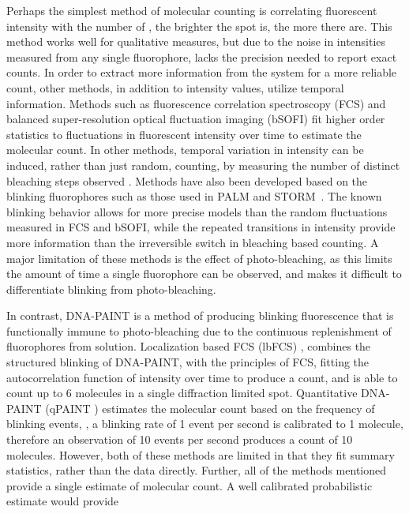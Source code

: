 Perhaps the simplest method of molecular counting is correlating fluorescent
  intensity with the number of \smallobjects \cite{schmied_2012, tolar_2005}, \ie the brighter the spot is, the more there are.
  This method works well for qualitative measures, but due to the noise in intensities 
  measured from any single fluorophore, lacks the precision needed to report exact counts.
  In order to extract more information from the system for a more reliable count, other methods, 
  in addition to intensity values, utilize temporal information.
  Methods such as fluorescence correlation spectroscopy (FCS) \cite{otsuka_2023, wachsmuth_2015, politi_2018} and 
  balanced super-resolution optical fluctuation imaging (bSOFI) \cite{geissbuehler_2012}
  fit higher order statistics to fluctuations in fluorescent intensity over time to estimate the molecular count.
  In other methods, temporal variation in intensity can be induced, rather than just random, \ie
  counting, by measuring the number of distinct bleaching steps observed \cite{ulbrich_2007, jain_2011}.
  Methods have also been developed based on the blinking fluorophores \cite{rollins_stochastic_2015, nino_2017} 
  such as those used in PALM \cite{sengupta_pcPALM_2011, lee_counting_2012} and STORM~\cite{patel_blinking_2021}. 
  The known blinking behavior allows for more precise models than the random fluctuations measured in FCS and bSOFI, while the 
  repeated transitions in intensity provide more information than the irreversible switch in bleaching based counting.
  A major limitation of these methods is the effect of photo-bleaching, as this limits the amount of time
  a single fluorophore can be observed, and makes it difficult to differentiate blinking from photo-bleaching.


In contrast, DNA-PAINT \cite{schnitzbauer_2017} is a method of producing blinking fluorescence that is functionally
    immune to photo-bleaching due to the continuous replenishment of fluorophores from solution. %
    Localization based FCS (lbFCS) \cite{stein_2021}, combines the structured blinking of DNA-PAINT, with the 
    principles of FCS, fitting the autocorrelation function of intensity over time to produce a count,
    and is able to count up to 6 molecules in a single diffraction limited spot.
    Quantitative DNA-PAINT (qPAINT \cite{jungmann_2016}) estimates the molecular count based on the frequency of blinking events, \ie, 
    a blinking rate of 1 event per second is calibrated to 1 molecule, therefore an observation of 10 events per second
    produces a count of 10 molecules.
    However, both of these methods are limited in that they fit summary statistics,
    rather than the data directly. 
    Further, all of the methods mentioned provide a single estimate of molecular count.
    A well calibrated probabilistic estimate would provide 
    
